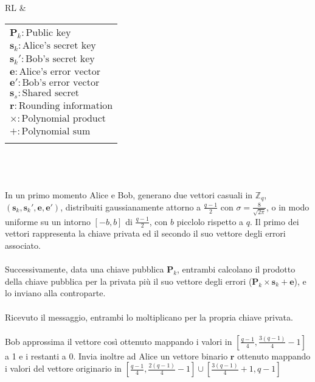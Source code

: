 \begin{tabular} {RL}
{    } &
    \tiny
    \begin{tabular} {|l|}
        \hline
        \\
        $\mathbf{P}_k    : \text{Public key}$            \\
        $\mathbf{s}_k    : \text{Alice's secret key}$    \\
        $\mathbf{s}_k'   : \text{Bob's secret key}$      \\
        $\mathbf{e}      : \text{Alice's error vector}$  \\
        $\mathbf{e}'     : \text{Bob's error vector}$    \\
        $\mathbf{s}_s    : \text{Shared secret}$         \\
        $\mathbf{r}      : \text{Rounding information}$  \\
        $\times : \text{Polynomial product}$    \\
        $+      : \text{Polynomial sum}$        \\
        \\
        \hline
    \end{tabular}
\end{tabular}\\
\\
\\
In un primo momento Alice e Bob, generano due vettori casuali in $\mathbb{Z}_q$,
$(\mathbf{s}_k, \mathbf{s}_k',\mathbf{e},\mathbf{e}')$, distribuiti
gaussianamente attorno a $\frac{q-1}{2}$ con $\sigma = \frac{8}{\sqrt{2\pi}}$,
o in modo uniforme su un intorno $[-b, b]$ di $\frac{q-1}{2}$, con $b$ picclolo
rispetto a $q$. Il primo dei vettori rappresenta la chiave privata ed il
secondo il suo vettore degli errori associato.\\
\pagebreak
\\
Successivamente, data una chiave pubblica $\mathbf{P}_k$, entrambi calcolano il
prodotto della chiave pubblica per la privata più il suo vettore degli errori
($\mathbf{P}_{k} \times \mathbf{s}_{k} + \mathbf{e}$), e lo inviano alla
controparte.\\
\\
Ricevuto il messaggio, entrambi lo moltiplicano per la propria chiave
privata.\\
\\
Bob approssima il vettore così ottenuto mappando i valori in
$[\frac{q-1}{4},\frac{3(q-1)}{4}-1]$ a 1 e i restanti a 0. Invia inoltre ad
Alice un vettore binario $\mathbf{r}$ ottenuto mappando i valori del vettore
originario in $[\frac{q-1}{4},\frac{2(q-1)}{4}-1]\cup[\frac{3(q-1)}{4}+1,q-1]$
